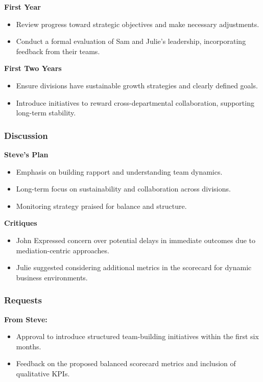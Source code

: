 \documentclass[a4paper,10pt]{article}
\begin{document}
\noindent \textbf{First Year}
\begin{itemize}
    \item Review progress toward strategic objectives and make necessary adjustments.
    \item Conduct a formal evaluation of Sam and Julie’s leadership, incorporating feedback from their teams.
\end{itemize}

\noindent \textbf{First Two Years}
\begin{itemize}
    \item Ensure divisions have sustainable growth strategies and clearly defined goals.
    \item Introduce initiatives to reward cross-departmental collaboration, supporting long-term stability.
\end{itemize}

\subsubsection{Discussion}
\noindent \textbf{Steve's Plan}
\begin{itemize}
    \item Emphasis on building rapport and understanding team dynamics.
    \item Long-term focus on sustainability and collaboration across divisions.
    \item Monitoring strategy praised for balance and structure.
\end{itemize}

\noindent \textbf{Critiques}
\begin{itemize}
    \item John Expressed concern over potential delays in immediate outcomes due to mediation-centric approaches.
    \item Julie suggested considering additional metrics in the scorecard for dynamic business environments.
\end{itemize}

\subsubsection{Requests}
\noindent \textbf{From Steve:}
\begin{itemize}
    \item Approval to introduce structured team-building initiatives within the first six months.
    \item Feedback on the proposed balanced scorecard metrics and inclusion of qualitative KPIs.
\end{itemize}
\end{document}
